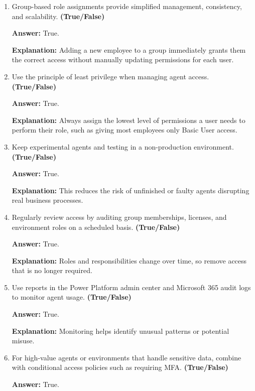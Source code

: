\documentclass[10pt]{article}
\begin{document}
\begin{enumerate}[leftmargin=*]
\textbf{Answer:} True.

\textbf{Explanation:} When you assign a role to a group, every member of that group automatically inherits the same permissions.

\item Group-based role assignments provide simplified management, consistency, and scalability. \textbf{(True/False)}

\textbf{Answer:} True.

\textbf{Explanation:} Adding a new employee to a group immediately grants them the correct access without manually updating permissions for each user.

\item Use the principle of least privilege when managing agent access. \textbf{(True/False)}

\textbf{Answer:} True.

\textbf{Explanation:} Always assign the lowest level of permissions a user needs to perform their role, such as giving most employees only Basic User access.

\item Keep experimental agents and testing in a non-production environment. \textbf{(True/False)}

\textbf{Answer:} True.

\textbf{Explanation:} This reduces the risk of unfinished or faulty agents disrupting real business processes.

\item Regularly review access by auditing group memberships, licenses, and environment roles on a scheduled basis. \textbf{(True/False)}

\textbf{Answer:} True.

\textbf{Explanation:} Roles and responsibilities change over time, so remove access that is no longer required.

\item Use reports in the Power Platform admin center and Microsoft 365 audit logs to monitor agent usage. \textbf{(True/False)}

\textbf{Answer:} True.

\textbf{Explanation:} Monitoring helps identify unusual patterns or potential misuse.

\item For high-value agents or environments that handle sensitive data, combine with conditional access policies such as requiring MFA. \textbf{(True/False)}

\textbf{Answer:} True.


\end{enumerate}
\end{document}
